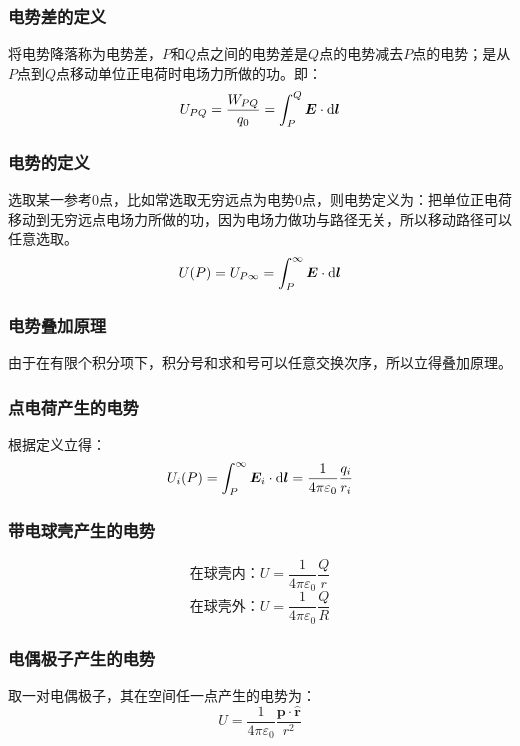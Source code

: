 \documentclass[UTF8,AutoFakeBold,b5paper]{ctexbook}
\begin{document}
\subsubsection{电势差的定义}
将电势降落称为电势差，$P$和$Q$点之间的电势差是$Q$点的电势减去$P$点的电势；是从 $P$点到$Q$点移动单位正电荷时电场力所做的功。即：
\begin{equation}
	U_{PQ} = \dfrac{W_{PQ}}{q_{0}} = \int_{P}^{Q}\bm{E}\cdot\ce{d}\bm{l} 
\end{equation}
\subsubsection{电势的定义}
选取某一参考$0$点，比如常选取无穷远点为电势$0$点，则电势定义为：把单位正电荷移动到无穷远点电场力所做的功，\textcolor[rgb]{0.56,0.28,0.16}{因为电场力做功与路径无关，所以移动路径可以任意选取}。
\begin{equation}
	U(P) = U_{P\infty} = \int_{P}^{\infty}\bm{E}\cdot\ce{d}\bm{l} 
\end{equation}
\subsubsection{电势叠加原理}
由于在有限个积分项下，积分号和求和号可以任意交换次序，所以立得叠加原理。
\subsubsection{点电荷产生的电势}
根据定义立得：
\begin{equation}
	U_{i}(P) = \int_{P}^{\infty} \bm{E}_{i}\cdot\ce{d}\bm{l}  =\dfrac{1}{4\pi\varepsilon_{0}}\dfrac{q_{i}}{r_{i}}
\end{equation}
\subsubsection{带电球壳产生的电势}
\begin{equation}
	\text{在球壳内：}U = \dfrac{1}{4\pi\varepsilon_{0}}\dfrac{Q}{r}
\end{equation}
\begin{equation}
	\text{在球壳外：}U = \dfrac{1}{4\pi\varepsilon_{0}}\dfrac{Q}{R}
\end{equation}
\subsubsection{电偶极子产生的电势}
取一对电偶极子，其在空间任一点产生的电势为：
\begin{equation}
	U =\dfrac{1}{4\pi\varepsilon_{0}}\dfrac{\bm{p}\cdot\hat{\bm{r}}}{r^{2}}
\end{equation}
\end{document}
